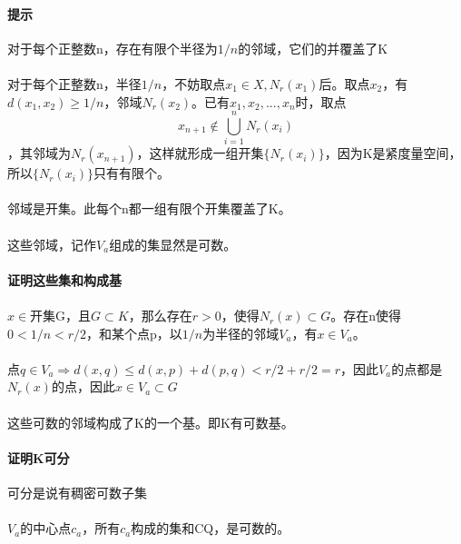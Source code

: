 \paragraph{提示} 对于每个正整数n，存在有限个半径为$ 1/n $的邻域，它们的并覆盖了K
\paragraph{} 对于每个正整数n，半径$ 1/n $，不妨取点$ x_1 \in X, N_r(x_1) $后。取点$ x_2 $，有$ d(x_1, x_2) \ge 1/n$，邻域$N_r(x_2)$。已有$x_1, x_2, ..., x_n$时，取点$$x_{n+1} \notin \bigcup_{i=1}^nN_r(x_i)$$，其邻域为$N_r(x_{n+1})$，这样就形成一组开集$\{N_r(x_i)\}$，因为K是紧度量空间，所以$\{N_r(x_i)\}$只有有限个。
\paragraph{} 邻域是开集。此每个n都一组有限个开集覆盖了K。
\paragraph{} 这些邻域，记作$V_a$组成的集显然是可数。
\paragraph{证明这些集和构成基} 
\paragraph{} $ x \in$开集G，且$ G \subset K$，那么存在$ r > 0$，使得$N_r(x) \subset G$。存在n使得$ 0 < 1/n < r/2 $，和某个点p，以$1/n$为半径的邻域$V_a$，有$x \in V_a$。
\paragraph{} 点$q \in V_a \Rightarrow d(x, q) \le d(x,p) + d(p, q) < r/2 + r/2 = r $，因此$V_a$的点都是$N_r(x)$的点，因此$ x \in V_a \subset G$
\paragraph{} 这些可数的邻域构成了K的一个基。即K有可数基。
\paragraph{证明K可分} 可分是说有稠密可数子集
\paragraph{} $V_a$的中心点$c_a$，所有$c_a$构成的集和CQ，是可数的。
